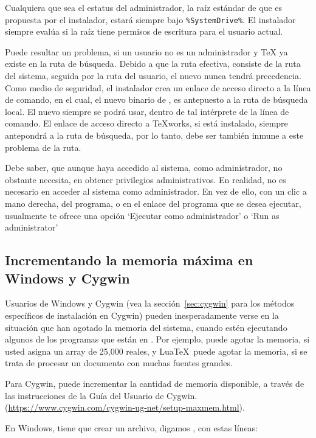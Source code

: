 \documentclass{article}
\begin{document}
Cualquiera que sea el estatus del administrador, la raíz estándar de
\TL{} que es propuesta por el instalador, estará siempre bajo
\verb|%SystemDrive%|. El instalador siempre evalúa si la raíz tiene
permisos de escritura para el usuario actual.

Puede resultar un problema, si un usuario no es un administrador y \TeX{}
ya existe en la ruta de búsqueda. Debido a que la ruta efectiva, consiste
de la ruta del sistema, seguida por la ruta del usuario, el nuevo \TL{}
nunca tendrá precedencia. Como medio de seguridad, el instalador crea un
enlace de acceso directo a la línea de comando, en el cual, el nuevo
binario de \TL{}, es antepuesto a la ruta de búsqueda local. El nuevo
\TL{} siempre se podrá usar, dentro de tal intérprete de la línea de
comando. El enlace de acceso directo a \TeX{}works, si está instalado,
siempre antepondrá \TL{} a la ruta de búsqueda, por lo tanto, debe ser
también inmune a este problema de la ruta. 

Debe saber, que aunque haya accedido al sistema, como administrador, no
obstante necesita, en obtener privilegios administrativos. En realidad, no es
necesario en acceder al sistema como administrador. En vez de ello, con un clic
a mano derecha, del programa, o en el enlace del programa que se desea
ejecutar, usualmente te ofrece una opción `Ejecutar como administrador' o `Run as administrator'

\subsection{Incrementando la memoria máxima en Windows y Cygwin}
\label{sec:cygwin-maxmem}

Usuarios de Windows y Cygwin (vea la sección~\ref{sec:cygwin} para los
métodos específicos de instalación en Cygwin) pueden inesperadamente
verse en la situación que han agotado la memoria del sistema, cuando
estén ejecutando algunos de los programas que están en \TL{}.  Por
ejemplo,  puede agotar la memoria, si usted asigna un array
de 25,000 reales, y Lua\TeX\ puede agotar la memoria, si se trata de
procesar un documento con muchas fuentes grandes. 

Para Cygwin, puede incrementar la cantidad de memoria disponible, a través
de las instrucciones de la Guía del Usuario de Cygwin.  
(\url{https://www.cygwin.com/cygwin-ug-net/setup-maxmem.html}).

En Windows, tiene que crear un archivo, digamos , con
estas líneas:
\end{document}
